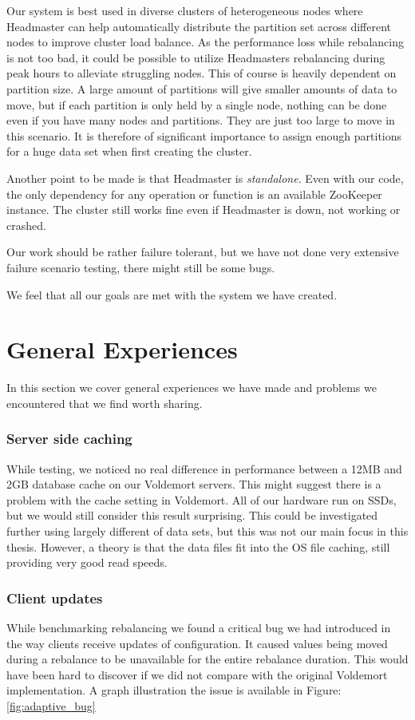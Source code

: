 Our system is best used in diverse clusters of heterogeneous nodes where Headmaster can help automatically distribute the partition set across different nodes to improve cluster load balance. As the performance loss while rebalancing is not too bad, it could be possible to utilize Headmasters rebalancing during peak hours to alleviate struggling nodes. This of course is heavily dependent on partition size. A large amount of partitions will give smaller amounts of data to move, but if each partition is only held by a single node, nothing can be done even if you have many nodes and partitions. They are just too large to move in this scenario. It is therefore of significant importance to assign enough partitions for a huge data set when first creating the cluster.

Another point to be made is that Headmaster is \emph{standalone}. Even with our code, the only dependency for any operation or function is an available ZooKeeper instance. The cluster still works fine even if Headmaster is down, not working or crashed.

Our work should be rather failure tolerant, but we have not done very extensive failure scenario testing, there might still be some bugs. 

We feel that all our goals are met with the system we have created.

\section{General Experiences}
\label{eval:exp}
In this section we cover general experiences we have made and problems we encountered that we find worth sharing. 

\subsubsection{Server side caching}
While testing, we noticed no real difference in performance between a 12MB and 2GB database cache on our Voldemort servers. This might suggest there is a problem with the cache setting in Voldemort. All of our hardware run on SSDs, but we would still consider this result surprising. This could be investigated further using largely different of data sets, but this was not our main focus in this thesis. However, a theory is that the data files fit into the OS file caching, still providing very good read speeds.

\subsubsection{Client updates}
While benchmarking rebalancing we found a critical bug we had introduced in the way clients receive updates of configuration. It caused values being moved during a rebalance to be unavailable for the entire rebalance duration. This would have been hard to discover if we did not compare with the original Voldemort implementation. A graph illustration the issue is available in Figure: \ref{fig:adaptive_bug}

